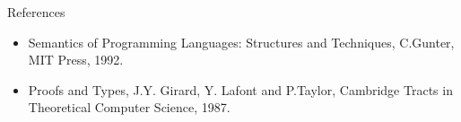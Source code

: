 \documentclass[9pt]{beamer}
\begin{document}
\begin{frame}{References}
	\begin{itemize}
		\item Semantics of Programming Languages: Structures and Techniques, C.Gunter, MIT Press, 1992.
		\item Proofs and Types, J.Y. Girard, Y. Lafont and P.Taylor, Cambridge Tracts in Theoretical Computer Science, 1987.
	\end{itemize}
\end{frame}
\end{document}
